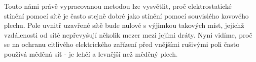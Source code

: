  Touto námi právě vypracovanou metodou lze vysvětlit, proč elektrostatické stínění pomocí sítě je
  často stejně dobré jako stínění pomocí souvislého kovového plechu. Pole uvnitř uzavřené sítě bude
  nulové s výjimkou takových míst, jejichž vzdálenosti od sítě nepřevyšují několik mezer mezi jejími
  dráty. Nyní vidíme, proč se na ochranu citlivého elektrického zařízení před vnějšími rušivými poli
  často používá měděná síť - je lehčí a levnější než měděný plech.